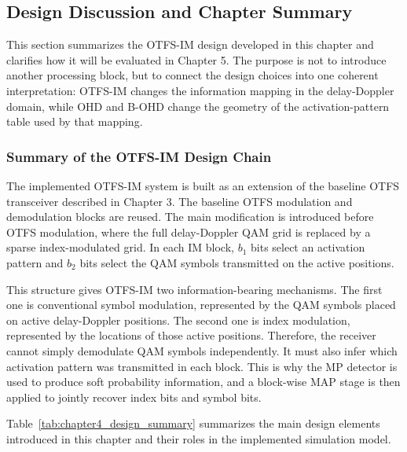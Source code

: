 \subsection{Design Discussion and Chapter Summary}

This section summarizes the OTFS-IM design developed in this chapter and clarifies how it will be evaluated in Chapter 5. The purpose is not to introduce another processing block, but to connect the design choices into one coherent interpretation: OTFS-IM changes the information mapping in the delay-Doppler domain, while OHD and B-OHD change the geometry of the activation-pattern table used by that mapping.

\subsubsection{Summary of the OTFS-IM Design Chain}

The implemented OTFS-IM system is built as an extension of the baseline OTFS transceiver described in Chapter 3. The baseline OTFS modulation and demodulation blocks are reused. The main modification is introduced before OTFS modulation, where the full delay-Doppler QAM grid is replaced by a sparse index-modulated grid. In each IM block, \(b_1\) bits select an activation pattern and \(b_2\) bits select the QAM symbols transmitted on the active positions.

This structure gives OTFS-IM two information-bearing mechanisms. The first one is conventional symbol modulation, represented by the QAM symbols placed on active delay-Doppler positions. The second one is index modulation, represented by the locations of those active positions. Therefore, the receiver cannot simply demodulate QAM symbols independently. It must also infer which activation pattern was transmitted in each block. This is why the MP detector is used to produce soft probability information, and a block-wise MAP stage is then applied to jointly recover index bits and symbol bits.

Table~\ref{tab:chapter4_design_summary} summarizes the main design elements introduced in this chapter and their roles in the implemented simulation model.

